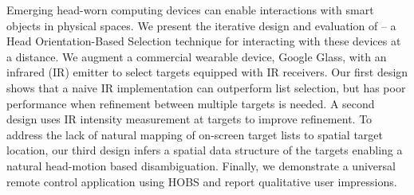 
Emerging head-worn computing devices can enable interactions with smart objects in physical spaces.
%
We present the iterative design and evaluation of \systemname -- a Head Orientation-Based Selection technique for interacting with these devices at a distance. We augment a commercial wearable device, Google Glass, with an infrared (IR) emitter to select targets equipped with IR receivers. Our first design shows that a naive IR implementation can outperform list selection, but has poor performance when refinement between multiple targets is needed. A second design uses IR intensity measurement at targets to improve refinement. To address the lack of natural mapping of on-screen target lists to spatial target location, our third design infers a spatial data structure of the targets enabling a natural head-motion based disambiguation.
%
Finally, we demonstrate a universal remote control application using HOBS and report qualitative user impressions.
